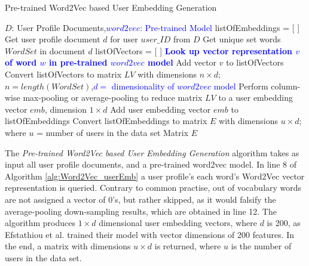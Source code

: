             \begin{algorithm}
            \caption{Pre-trained Word2Vec based User Embedding Generation}
            \label{alg:Word2Vec_userEmb}
            \begin{algorithmic}[1]
                \REQUIRE $D$: User Profile Documents,\textcolor{blue}{$word2vec$: Pre-trained Model}
                \STATE listOfEmbeddings = [ ]
                    \STATE Get user profile document $d$ for user $user\_ID$ from $D$
                    \STATE Get unique set words $WordSet$ in document $d$
                    \STATE listOfVectors = [ ]
                    \STATE
                        \STATE \textbf{\textcolor{blue}{Look up vector representation $v$ of word $w$ in pre-trained $word2vec$ model}}
                        \STATE Add vector $v$ to listOfVectors
                    \ENDFOR
                    \STATE Convert listOfVectors to matrix $LV$ with dimensions $n \times d$; $n=length(WordSet)$,\textcolor{blue}{$d=$ dimensionality of $word2vec$ model}
                    \STATE Perform column-wise max-pooling or average-pooling to reduce matrix $LV$ to a user embedding vector $emb$, dimension $1 \times d$
                    \STATE Add user embedding vector $emb$ to listOfEmbeddings
                \ENDFOR
                \STATE Convert listOfEmbeddings to matrix $E$ with dimensions $u \times d$; where $u$ = number of users in the data set
                \RETURN Matrix $E$
            \end{algorithmic}
            \end{algorithm}
            
             The \emph{Pre-trained Word2Vec based User Embedding Generation} algorithm takes as input all user profile documents, and a pre-trained word2vec model. In line 8 of Algorithm \ref{alg:Word2Vec_userEmb} a user profile's each word's Word2Vec vector representation is queried. Contrary to common practise, out of vocabulary words are not assigned a vector of 0's, but rather skipped, as it would falsify the average-pooling down-sampling results, which are obtained in line 12. The algorithm produces $1 \times d$ dimensional user embedding vectors, where $d$ is 200, as Efstathiou et al. \cite{efstathiou2018word} trained their model with vector dimensions of 200 features. In the end, a matrix with dimensions $u \times d$ is returned, where $u$ is the number of users in the data set.
        
